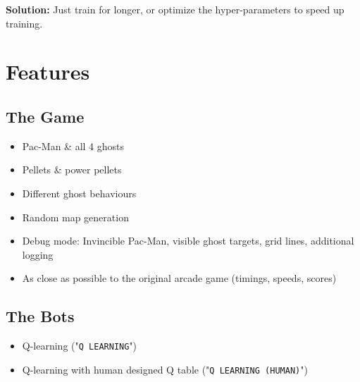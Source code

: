 \documentclass[10pt, letterpaper]{article}
\begin{document}
            \vspace{1em}\noindent
            \textbf{Solution:} Just train for longer, or optimize the hyper-parameters to speed up training.
    \newpage
        
    \section{Features}
        \subsection{The Game}
            \begin{itemize}
                \item Pac-Man \& all 4 ghosts
                \item Pellets \& power pellets
                \item Different ghost behaviours
                \item Random map generation
                \item Debug mode: Invincible Pac-Man, visible ghost targets, grid lines, additional logging
                \item As close as possible to the original arcade game (timings, speeds, scores)
            \end{itemize}
            
        \subsection{The Bots}
            \begin{itemize}
                \item Q-learning ("\texttt{Q LEARNING}")
                \item Q-learning with human designed Q table ("\texttt{Q LEARNING (HUMAN)}")
            \end{itemize}
            
\end{document}
